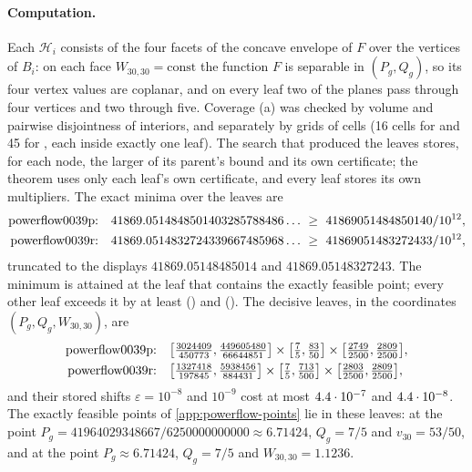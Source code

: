 \paragraph{Computation.}
Each $\mathcal H_i$ consists of the four facets of the concave envelope of $F$ over the vertices of $B_i$:
on each face $W_{30,30}=\mathrm{const}$ the function $F$ is separable in $(P_g,Q_g)$, so its four vertex values are coplanar, and on every leaf two of the planes pass through four vertices and two through five.
Coverage (a) was checked by volume and pairwise disjointness of interiors, and separately by grids of cells (16 cells for  and 45 for , each inside exactly one leaf).
The search that produced the leaves stores, for each node, the larger of its parent's bound and its own certificate; the theorem uses only each leaf's own certificate, and every leaf stores its own multipliers.
The exact minima over the leaves are
\begin{align*}
\text{\inst{powerflow0039p}:}\quad &41869.0514848501403285788486\ldots\ \ge\ 41869051484850140/10^{12},\\
\text{\inst{powerflow0039r}:}\quad &41869.0514832724339667485968\ldots\ \ge\ 41869051483272433/10^{12},
\end{align*}
truncated to the displays $41869.05148485014$ and $41869.05148327243$.
The minimum is attained at the leaf that contains the exactly feasible point; every other leaf exceeds it by at least  () and  ().
The decisive leaves, in the coordinates $(P_g,Q_g,W_{30,30})$, are
\begin{align*}
\text{\inst{powerflow0039p}:}\quad &\bigl[\tfrac{3024409}{450773},\tfrac{449605480}{66644851}\bigr]\times\bigl[\tfrac75,\tfrac{83}{50}\bigr]\times\bigl[\tfrac{2749}{2500},\tfrac{2809}{2500}\bigr],\\
\text{\inst{powerflow0039r}:}\quad &\bigl[\tfrac{1327418}{197845},\tfrac{5938456}{884431}\bigr]\times\bigl[\tfrac75,\tfrac{713}{500}\bigr]\times\bigl[\tfrac{2803}{2500},\tfrac{2809}{2500}\bigr],
\end{align*}
and their stored shifts $\varepsilon=10^{-8}$ and $10^{-9}$ cost at most $4.4\cdot 10^{-7}$ and $4.4\cdot 10^{-8}$.
The exactly feasible points of \cref{app:powerflow-points} lie in these leaves:
at the  point $P_g=41964029348667/6250000000000\approx6.71424$, $Q_g=7/5$ and $v_{30}=53/50$, and at the  point $P_g\approx6.71424$, $Q_g=7/5$ and $W_{30,30}=1.1236$.

